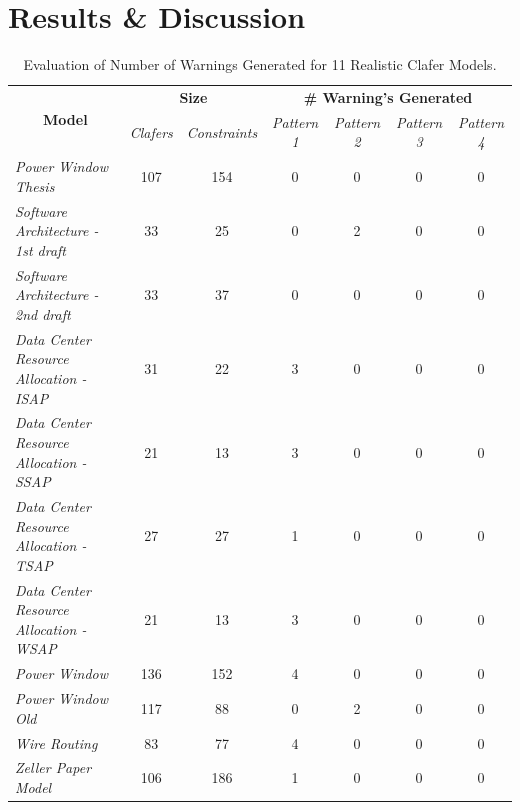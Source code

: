 \documentclass[10pt,oneside]{IEEEtran}
\begin{document}
\section{Results \& Discussion}
\begin{table}[ht]
\centering
\caption{Evaluation of Number of Warnings Generated for 11 Realistic Clafer Models.}
\label{tbl:warningGeneratedAndSize}
\begin{tabular}{@{}l|cccccc@{}}
\multicolumn{1}{c|}{\multirow{2}{*}{{\bf Model}}} & \multicolumn{2}{c}{{\bf Size}}   & \multicolumn{4}{c}{{\bf \# Warning's Generated}}                      \\ \cmidrule(l){2-7}
\multicolumn{1}{c|}{}                             & {\it Clafers} & {\it Constraints} & {\it Pattern 1} & {\it Pattern 2} & {\it Pattern 3} & {\it Pattern 4} \\ \midrule
{\it Power Window Thesis}                         & 107           & 154               & 0               & 0               & 0               & 0               \\ \midrule
{\it Software Architecture - 1st draft}           & 33            & 25                & 0               & 2               & 0               & 0               \\ \midrule
{\it Software Architecture - 2nd draft}           & 33            & 37                & 0               & 0               & 0               & 0               \\ \midrule
{\it Data Center Resource Allocation - ISAP}      & 31            & 22                & 3               & 0               & 0               & 0               \\ \midrule
{\it Data Center Resource Allocation - SSAP}      & 21            & 13                & 3               & 0               & 0               & 0               \\ \midrule
{\it Data Center Resource Allocation - TSAP}      & 27            & 27                & 1               & 0               & 0               & 0               \\ \midrule
{\it Data Center Resource Allocation - WSAP}      & 21            & 13                & 3               & 0               & 0               & 0               \\ \midrule
{\it Power Window}                                & 136           & 152               & 4               & 0               & 0               & 0               \\ \midrule
{\it Power Window Old}                            & 117           & 88                & 0               & 2               & 0               & 0               \\ \midrule
{\it Wire Routing}                                & 83            & 77                & 4               & 0               & 0               & 0               \\ \midrule
{\it Zeller Paper Model}                          & 106           & 186               & 1               & 0               & 0               & 0
\end{tabular}
\end{table}
\end{document}
